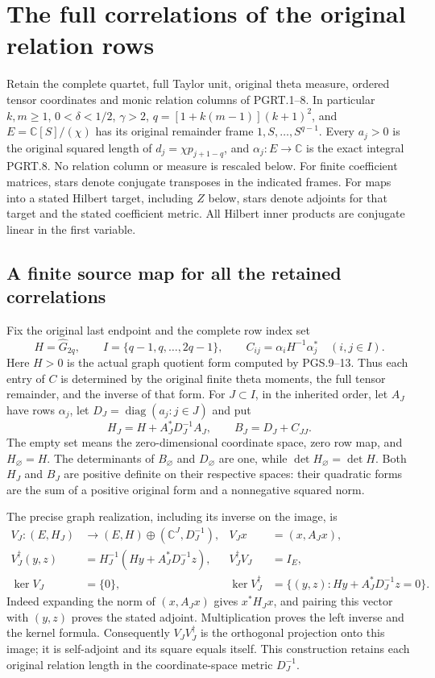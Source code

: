 \section{The full correlations of the original relation rows}
\label{sec:pgrc}

Retain the complete quartet, full Taylor unit, original theta measure,
ordered tensor coordinates and monic relation columns of PGRT.1--8.
In particular $k,m\geq1$, $0<\delta<1/2$, $\gamma>2$,
$q=[1+k(m-1)](k+1)^2$, and $E=\mathbb C[S]/(\chi)$ has its
original remainder frame $1,S,\ldots,S^{q-1}$. Every $a_j>0$ is
the original squared length of $d_j=\chi p_{j+1-q}$, and
$\alpha_j:E\to\mathbb C$ is the exact integral PGRT.8. No relation
column or measure is rescaled below. For finite coefficient matrices,
stars denote conjugate transposes in the indicated frames. For maps
into a stated Hilbert target, including $Z$ below, stars denote
adjoints for that target and the stated coefficient metric. All
Hilbert inner products are conjugate linear in the first variable.

\subsection{A finite source map for all the retained correlations}

Fix the original last endpoint and the complete row index set
\[
 H=\widehat G_{2q},\qquad I=\{q-1,q,\ldots,2q-1\},\qquad
 C_{ij}=\alpha_iH^{-1}\alpha_j^*\quad(i,j\in I).
 \tag{PGRC.1}\label{eq:pgrc-original-gram}
\]
Here $H>0$ is the actual graph quotient form computed by PGS.9--13.
Thus each entry of $C$ is determined by the original finite theta
moments, the full tensor remainder, and the inverse of that form.
For $J\subset I$, in the inherited order, let $A_J$ have rows
$\alpha_j$, let $D_J=\operatorname{diag}(a_j:j\in J)$ and put
\[
 H_J=H+A_J^*D_J^{-1}A_J,
 \qquad B_J=D_J+C_{JJ}.
 \tag{PGRC.2}\label{eq:pgrc-subset-forms}
\]
The empty set means the zero-dimensional coordinate space, zero
row map, and $H_\varnothing=H$. The determinants of
$B_\varnothing$ and $D_\varnothing$ are one, while
$\det H_\varnothing=\det H$. Both
$H_J$ and $B_J$ are positive definite on their respective spaces:
their quadratic forms are the sum of a positive original form
and a nonnegative squared norm.

The precise graph realization, including its inverse on the image,
is
\[
 \begin{aligned}
 V_J:(E,H_J)&\longrightarrow(E,H)\oplus(\mathbb C^J,D_J^{-1}),
 &V_Jx&=(x,A_Jx),\\
 V_J^\dagger(y,z)&=H_J^{-1}(Hy+A_J^*D_J^{-1}z),
 &V_J^\dagger V_J&=I_E,\\
 \ker V_J&=\{0\},
 &\ker V_J^\dagger&=\{(y,z):Hy+A_J^*D_J^{-1}z=0\}.
 \end{aligned}
 \tag{PGRC.3}\label{eq:pgrc-source-map}
\]
Indeed expanding the norm of $(x,A_Jx)$ gives $x^*H_Jx$,
and pairing this vector with $(y,z)$ proves the stated adjoint.
Multiplication proves the left inverse and the kernel formula.
Consequently $V_JV_J^\dagger$ is the orthogonal projection onto
this image; it is self-adjoint and its square equals itself.
This construction retains each original relation length in the
coordinate-space metric $D_J^{-1}$.

